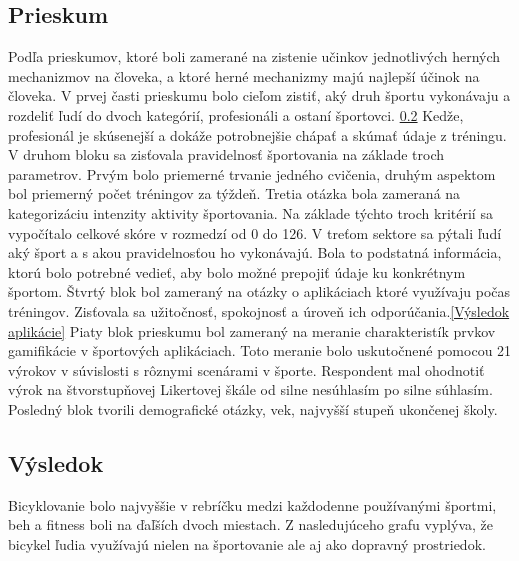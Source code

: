 \documentclass[10pt,twoside,slovak,a4paper]{article}
\begin{document}
\subsection{Prieskum} \label{Prieskum}
Podľa prieskumov, ktoré boli zamerané na zistenie učinkov jednotlivých herných mechanizmov na človeka, a ktoré herné mechanizmy majú najlepší účinok na človeka. V prvej časti prieskumu bolo cieľom zistiť, aký druh športu vykonávaju a  rozdeliť ľudí do dvoch kategórií, profesionáli a ostaní športovci. \ref{Výsledok} Kedže, profesionál je skúsenejší a dokáže potrobnejšie chápať a skúmať údaje z tréningu. V druhom bloku sa zisťovala pravidelnosť športovania na základe troch parametrov. Prvým bolo priemerné trvanie jedného cvičenia, druhým aspektom bol priemerný počet tréningov za týždeň. Tretia otázka bola zameraná na kategorizáciu intenzity aktivity športovania. Na základe týchto troch kritérií sa vypočítalo celkové skóre v rozmedzí od 0 do 126. \cite{Effect_of_gamification-Framework} V treťom sektore sa pýtali ľudí aký šport a s akou pravidelnosťou ho vykonávajú. Bola to podstatná informácia, ktorú bolo potrebné vedieť, aby bolo možné prepojiť údaje ku konkrétnym športom. Štvrtý blok bol zameraný na otázky o aplikáciach ktoré využívaju počas tréningov. Zisťovala sa užitočnosť, spokojnosť a úroveň ich odporúčania.\ref{Výsledok aplikácie} Piaty blok prieskumu bol zameraný na meranie charakteristík prvkov gamifikácie v športových aplikáciach. Toto meranie bolo uskutočnené pomocou 21 výrokov v súvislosti s rôznymi scenárami v športe. Respondent mal ohodnotiť výrok na štvorstupňovej Likertovej škále od silne nesúhlasím po silne súhlasím.
Posledný blok tvorili demografické otázky, vek, najvyšší stupeň ukončenej školy.\cite{Effect_of_gamification-Framework}
\newpage
\subsection{Výsledok} \label{Výsledok}
Bicyklovanie bolo najvyššie v rebríčku medzi každodenne používanými športmi, beh a fitness boli na ďaľších dvoch miestach. Z nasledujúceho grafu vyplýva, že bicykel ľudia využívajú nielen na športovanie ale aj ako dopravný prostriedok.\cite{Effect_of_gamification-Framework}
\end{document}
